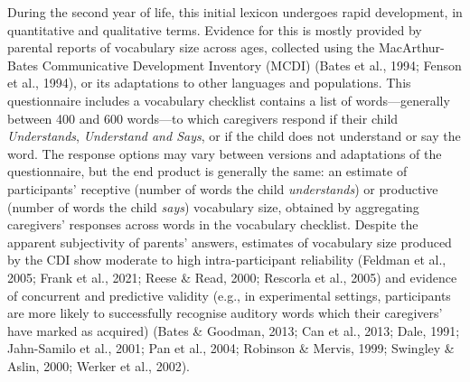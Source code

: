 \documentclass[
  12pt,
  b5paperpaper,
  twoside]{scrreprt}
\begin{document}
During the second year of life, this initial lexicon undergoes rapid
development, in quantitative and qualitative terms. Evidence for this is
mostly provided by parental reports of vocabulary size across ages,
collected using the MacArthur-Bates Communicative Development Inventory
(MCDI) (Bates et al., 1994; Fenson et al., 1994), or its adaptations to
other languages and populations. This questionnaire includes a
vocabulary checklist contains a list of words---generally between 400
and 600 words---to which caregivers respond if their child
\emph{Understands}, \emph{Understand and Says}, or if the child does not
understand or say the word. The response options may vary between
versions and adaptations of the questionnaire, but the end product is
generally the same: an estimate of participants' receptive (number of
words the child \emph{understands}) or productive (number of words the
child \emph{says}) vocabulary size, obtained by aggregating caregivers'
responses across words in the vocabulary checklist. Despite the apparent
subjectivity of parents' answers, estimates of vocabulary size produced
by the CDI show moderate to high intra-participant reliability (Feldman
et al., 2005; Frank et al., 2021; Reese \& Read, 2000; Rescorla et al.,
2005) and evidence of concurrent and predictive validity (e.g., in
experimental settings, participants are more likely to successfully
recognise auditory words which their caregivers' have marked as
acquired) (Bates \& Goodman, 2013; Can et al., 2013; Dale, 1991;
Jahn-Samilo et al., 2001; Pan et al., 2004; Robinson \& Mervis, 1999;
Swingley \& Aslin, 2000; Werker et al., 2002).
\end{document}
